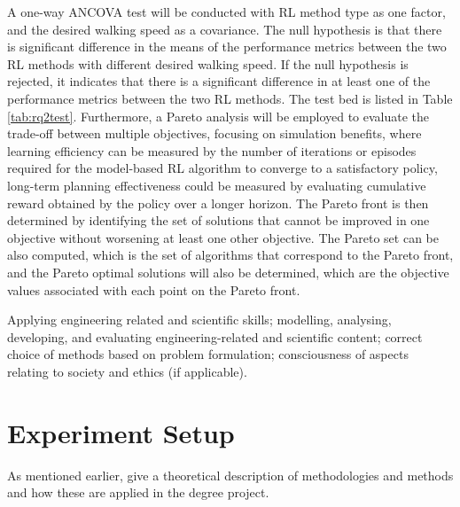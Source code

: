 A one-way ANCOVA test will be conducted with RL method type as one factor, and the desired walking speed as a covariance. The null hypothesis is that there is significant difference in the means of the performance metrics between the two RL methods with different desired walking speed. If the null hypothesis is rejected, it indicates that there is a significant difference in at least one of the performance metrics between the two RL methods. The test bed is listed in Table \ref{tab:rq2test}. Furthermore, a Pareto analysis will be employed to evaluate the trade-off between multiple objectives, focusing on simulation benefits, where learning efficiency can be measured by the number of iterations or episodes required for the model-based RL algorithm to converge to a satisfactory policy, long-term planning effectiveness could be measured by evaluating cumulative reward obtained by the policy over a longer horizon. The Pareto front is then determined by identifying the set of solutions that cannot be improved in one objective without worsening at least one other objective. The Pareto set can be also computed, which is the set of algorithms that correspond to the Pareto front, and the Pareto optimal solutions will also be determined, which are the objective values associated with each point on the Pareto front. 


Applying engineering related and scientific skills; modelling, analysing, developing, and evaluating engineering-related and scientific content; correct choice of methods based on problem formulation; consciousness of aspects relating to society and ethics (if applicable).

\section{Experiment Setup}


As mentioned earlier, give a theoretical description of methodologies and methods and how these are applied in the degree project.
